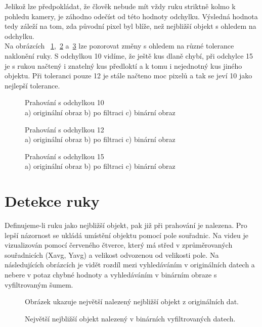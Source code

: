 Jelikož lze předpokládat, že člověk nebude mít vždy ruku striktně kolmo k pohledu kamery, je záhodno odečíst od této hodnoty odchylku. Výsledná hodnota tedy záleží na tom, zda původní pixel byl blíže, než nejbližší objekt s ohledem na odchylku.\\
Na obrázcích ~\ref{pic12},~\ref{pic13} a~\ref{pic14} lze pozorovat změny s ohledem na různé tolerance naklonění ruky. S odchylkou 10 vidíme, že ještě kus dlaně chybí, při odchylce 15 je s rukou načtený i znatelný kus předloktí a k tomu i nejednotný kus jiného objektu. Při toleranci pouze 12 je stále načteno moc pixelů a tak se jeví 10 jako nejlepší tolerance.\\

\begin{figure}[htp]
\centering
{} \hfill
{} \hfill
{}
\caption{Prahování s odchylkou 10 \\ a) originální obraz b) po filtraci c) binární obraz}
\label{pic12}
\end{figure}
\begin{figure}[htp]
\centering
{} \hfill
{} \hfill
{}
\caption{Prahování s odchylkou 12 \\ a) originální obraz b) po filtraci c) binární obraz}
\label{pic13}
\end{figure}
\begin{figure}[htp]
\centering
{} \hfill
{} \hfill
{}
\caption{Prahování s odchylkou 15 \\ a) originální obraz b) po filtraci c) binární obraz}
\label{pic14}
\end{figure}
\newpage
\section{Detekce ruky}
Definujeme-li ruku jako nejbližší objekt, pak již při prahování je nalezena. Pro lepší názornost se ukládá umístění objektu pomocí pole souřadnic. Na videu je vizualizován pomocí červeného čtverce, který má střed v zprůměrovaných souřadnicích (Xavg, Yavg) a velikost odvozenou od velikosti pole. 
Na následujících obrázcích je vidět rozdíl mezi vyhledáváním v originálních datech a nebere v potaz chybné hodnoty a vyhledáváním v binárním obraze s vyfiltrovaným šumem.
\begin{figure}[htp]
\centering
{}
\caption{Obrázek ukazuje největší nalezený nejbližší objekt z originálních dat.}
\label{pic15}
\end{figure}
\begin{figure}[htp]
\centering
{}
\caption{Největší nejbližší objekt nalezený v binárních vyfiltrovaných datech.}
\label{pic16}
\end{figure}

